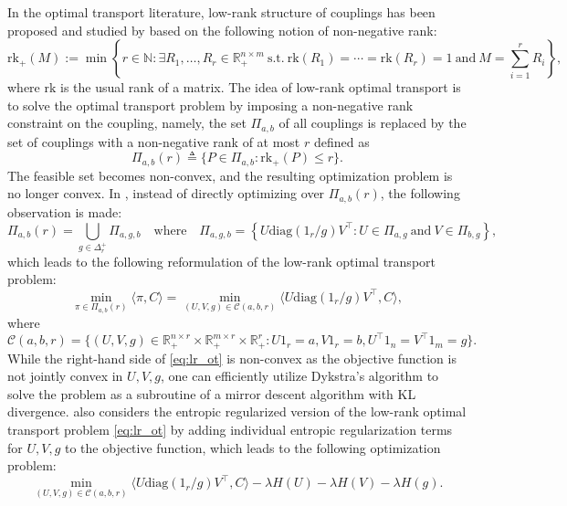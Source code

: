 \documentclass{article}
\theoremstyle{definition}
\newcommand{\cC}{\mathcal{C}}
\newcommand{\N}{\mathbb{N}}
\newcommand{\R}{\mathbb{R}}
\begin{document}
In the optimal transport literature, low-rank structure of couplings has been proposed and studied by \cite{forrow2019statistical,scetbon2021low,scetbon2022low} based on the following notion of non-negative rank:
\begin{equation}
    \label{eq:non_negative_rank}
    \mathrm{rk}_+(M) := \min\left\{r \in \N : \exists R_1, \ldots, R_r \in \R_+^{n \times m} ~ \text{s.t.} ~ \mathrm{rk}(R_1) = \cdots = \mathrm{rk}(R_r) = 1 ~ \text{and} ~ M = \sum_{i = 1}^{r} R_i\right\},
\end{equation}
where $\mathrm{rk}$ is the usual rank of a matrix. The idea of low-rank optimal transport is to solve the optimal transport problem by imposing a non-negative rank constraint on the coupling, namely, the set $\Pi_{a, b}$ of all couplings is replaced by the set of couplings with a non-negative rank of at most $r$ defined as 
\begin{equation*}    
    \Pi_{a, b}(r) \triangleq \{P \in \Pi_{a, b} : \mathrm{rk}_+(P) \le r\}.
\end{equation*}
The feasible set becomes non-convex, and the resulting optimization problem is no longer convex. In \cite{scetbon2021low}, instead of directly optimizing over $\Pi_{a, b}(r)$, the following observation is made:
\begin{equation}
    \label{eq:lr_ot}
    \Pi_{a, b}(r) = \bigcup_{g \in \Delta_r^+} \Pi_{a, g, b}
    \quad \text{where} \quad
    \Pi_{a, g, b} = \left\{U \mathrm{diag}(1_r / g) V^\top : U \in \Pi_{a, g} ~ \text{and} ~ V \in \Pi_{b, g}\right\},
\end{equation}
which leads to the following reformulation of the low-rank optimal transport problem:
\begin{equation*}
    \min_{\pi \in \Pi_{a, b}(r)} \langle \pi, C \rangle = \min_{(U, V, g) \in \cC(a, b, r)} \langle U \mathrm{diag}(1_r / g) V^\top, C \rangle,
\end{equation*}
where
\begin{equation}
    \label{eq:lr_feasible_set}
    \cC(a, b, r) = \{(U, V, g) \in \R_+^{n \times r} \times \R_+^{m \times r} \times \R_+^r : U 1_r = a, V 1_r = b, U^\top 1_n = V^\top 1_m = g\}.
\end{equation}
While the right-hand side of \eqref{eq:lr_ot} is non-convex as the objective function is not jointly convex in $U, V, g$, one can efficiently utilize Dykstra's algorithm \cite{dykstra1983algorithm} to solve the problem as a subroutine of a mirror descent algorithm with KL divergence. \cite{scetbon2021low} also considers the entropic regularized version of the low-rank optimal transport problem \eqref{eq:lr_ot} by adding individual entropic regularization terms for $U, V, g$ to the objective function, which leads to the following optimization problem:
\begin{equation*}
    \min_{(U, V, g) \in \cC(a, b, r)} \langle U \mathrm{diag}(1_r / g) V^\top, C \rangle - \lambda H(U) - \lambda H(V) - \lambda H(g).
\end{equation*}
\end{document}
